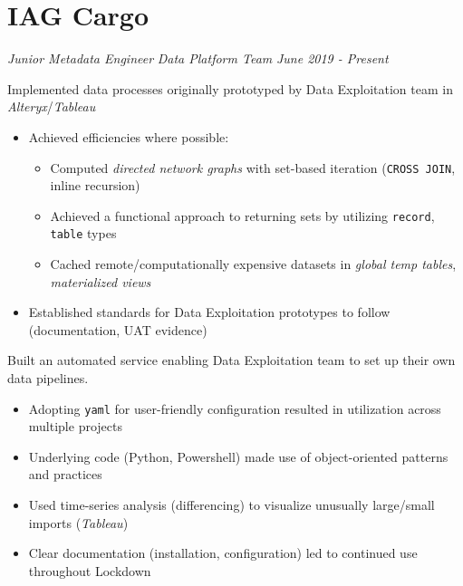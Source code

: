 \documentclass[../cv.tex]{subfiles}
\begin{document}
\section{IAG Cargo}
\textit{Junior Metadata Engineer}
\hfill
\textit{Data Platform Team}
\hfill
\textit{June 2019 - Present}
\begin{description}[style=multiline, leftmargin=3.5cm]
	\item[Prototype Implementation\\\textnormal{PL/SQL}] Implemented data processes originally prototyped by Data Exploitation team in \textit{Alteryx}/\textit{Tableau}
	      \begin{itemize}
		      \item Achieved efficiencies where possible:
		            \begin{itemize}
			            \item Computed \textit{directed network graphs} with set-based iteration (\texttt{CROSS JOIN}, inline recursion)
			            \item Achieved a functional approach to returning sets by utilizing \texttt{record}, \texttt{table} types
			            \item Cached remote/computationally expensive datasets in \textit{global temp tables}, \textit{materialized views}
		            \end{itemize}
		      \item Established standards for Data Exploitation prototypes to follow (documentation, UAT evidence)
	      \end{itemize}
	\item[Self-Service Pipeline Creation\\\textnormal{Python, Powershell}]
	      Built an automated service enabling Data Exploitation team to set up their own data pipelines.
	      \begin{itemize}
			  \item Adopting \texttt{yaml} for user-friendly configuration resulted in utilization across multiple projects
			  \item Underlying code (Python, Powershell) made use of object-oriented patterns and practices
			  \item Used time-series analysis (differencing) to visualize unusually large/small imports (\textit{Tableau})
		     \item Clear documentation (installation, configuration) led to continued use throughout Lockdown

\end{itemize}
\end{description}
\end{document}
